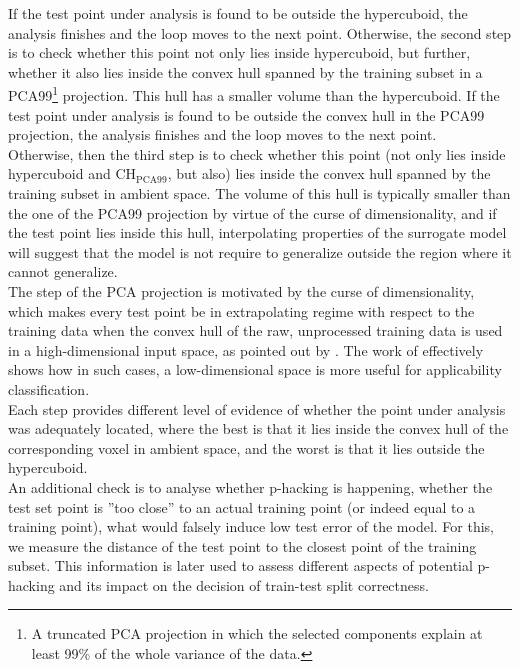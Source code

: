 %
\indent If the test point under analysis is found to be outside the hypercuboid, the analysis finishes and the loop moves to the next point. Otherwise, the second step is to check whether this point not only lies inside hypercuboid, but further, whether it also lies inside the convex hull spanned by the training subset in a PCA99\footnote{A truncated PCA projection in which the selected components explain at least 99\% of the whole variance of the data.} projection. This hull has a smaller volume than the hypercuboid. If the test point under analysis is found to be outside the convex hull in the PCA99 projection, the analysis finishes and the loop moves to the next point.\\
% 
\indent Otherwise, then the third step is to check whether this point (not only lies inside hypercuboid and $\text{CH}_\text{PCA99}$, but also) lies inside the convex hull spanned by the training subset in ambient space. The volume of this hull is typically smaller than the one of the PCA99 projection by virtue of the curse of dimensionality, and if the test point lies inside this hull, interpolating properties of the surrogate model will suggest that the model is not require to generalize outside the region where it cannot generalize.\\
%
The step of the PCA projection is motivated by the curse of dimensionality, which makes every test point be in extrapolating regime with respect to the training data when the convex hull of the raw, unprocessed training data is used in a high-dimensional input space, as pointed out by \cite{balestriero2021learning}. The work of \cite{bonnasse2022interpolation} effectively shows how in such cases, a low-dimensional space is more useful for applicability classification.\\
%
\indent Each step provides different level of evidence of whether the point under analysis was adequately located, where the best is that it lies inside the convex hull of the corresponding voxel in ambient space, and the worst is that it lies outside the hypercuboid.\\
%
\indent An additional check is to analyse whether p-hacking is happening, \ie whether the test set point is ''too close'' to an actual training point (or indeed equal to a training point), what would falsely induce low test error of the model. For this, we measure the distance of the test point to the closest point of the training subset. This information is later used to assess different aspects of potential p-hacking and its impact on the decision of train-test split correctness.\\
